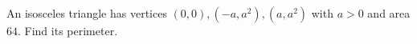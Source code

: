 An isosceles triangle has vertices $(0,0),(-a,a^2),(a,a^2)$ with $a>0$ and area $64$. Find its perimeter.
